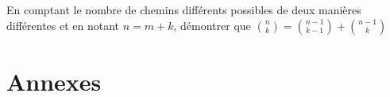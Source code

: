 \documentclass[oneside,12pt]{book}          %
\begin{document}
En comptant le nombre de chemins différents possibles de deux manières différentes et en notant $n=m+k$, démontrer que $\binom{n}{k}=\binom{n-1}{k-1}+\binom{n-1}{k}$







\chapter{Annexes}
\newpage




    
\end{document}

